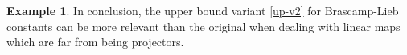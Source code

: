 \documentclass[a4paper,english]{amsart}
\theoremstyle{definition}
\newtheorem*{example}{Example}
\newcommand{\R}{\mathbb{R}}
\newcommand{\bba}{\boldsymbol{\alpha}}
\newcommand{\1}{\mathbbm{1}}
\newcommand{\sD} {{\mathscr D}}
\newcommand{\sA}{\mathscr{A}}
\DeclareMathOperator{\rk}{rk}
\renewcommand{\parallel}{\mathbin{/\mkern-5mu/}}
\newcommand{\abs}[1]{\lvert#1\rvert}    %
\newcommand{\norm}[1]{\lVert#1\rVert}   %
\DeclareMathOperator{\Gr}{Gr}
\DeclareMathOperator{\Ker}{Ker}
\begin{document}
\begin{example}
In conclusion,  the  upper bound variant \eqref{up-v2}  for Brascamp-Lieb constants can be more relevant than the original   when dealing with linear maps which are far from being projectors.

\bigskip

\end{example}



\end{document}
